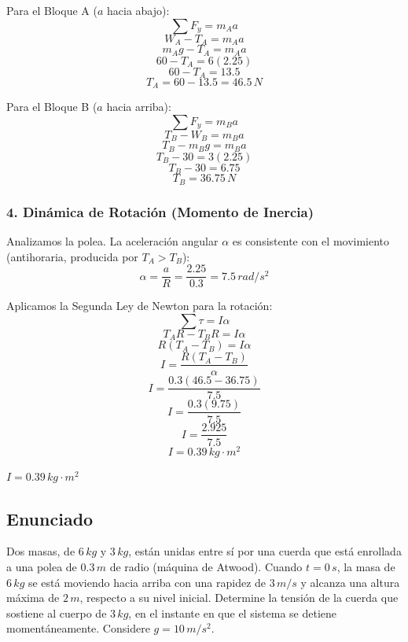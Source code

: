 \documentclass[12pt, a4paper]{article}
\begin{document}
Para el Bloque A ($a$ hacia abajo):
$$\sum F_y = m_A a$$
$$W_A - T_A = m_A a$$
$$m_A g - T_A = m_A a$$
$$60 - T_A = 6(2.25)$$
$$60 - T_A = 13.5$$
$$T_A = 60 - 13.5 = 46.5 \, \si{N}$$

Para el Bloque B ($a$ hacia arriba):
$$\sum F_y = m_B a$$
$$T_B - W_B = m_B a$$
$$T_B - m_B g = m_B a$$
$$T_B - 30 = 3(2.25)$$
$$T_B - 30 = 6.75$$
$$T_B = 36.75 \, \si{N}$$

\subsubsection*{4. Dinámica de Rotación (Momento de Inercia)}
Analizamos la polea. La aceleración angular $\alpha$ es consistente con el movimiento (antihoraria, producida por $T_A > T_B$):
$$\alpha = \frac{a}{R} = \frac{2.25}{0.3} = 7.5 \, \si{rad/s^2}$$

Aplicamos la Segunda Ley de Newton para la rotación:
$$\sum \tau = I \alpha$$
$$T_A R - T_B R = I \alpha$$
$$R(T_A - T_B) = I \alpha$$
$$I = \frac{R(T_A - T_B)}{\alpha}$$
$$I = \frac{0.3 (46.5 - 36.75)}{7.5}$$
$$I = \frac{0.3 (9.75)}{7.5}$$
$$I = \frac{2.925}{7.5}$$
$$I = 0.39 \, \si{kg\cdot m^2}$$

\begin{tcolorbox}[colback=green!5!white, colframe=green!50!black, title=Respuesta Final]
\centering \Large $I = 0.39 \, \si{kg\cdot m^2}$
\end{tcolorbox}

\newpage

\subsection*{Enunciado}
Dos masas, de $6 \, \si{kg}$ y $3 \, \si{kg}$, están unidas entre sí por una cuerda que está enrollada a una polea de $0.3 \, \si{m}$ de radio (máquina de Atwood). Cuando $t = 0 \, \si{s}$, la masa de $6 \, \si{kg}$ se está moviendo hacia arriba con una rapidez de $3 \, \si{m/s}$ y alcanza una altura máxima de $2 \, \si{m}$, respecto a su nivel inicial. Determine la tensión de la cuerda que sostiene al cuerpo de $3 \, \si{kg}$, en el instante en que el sistema se detiene momentáneamente. Considere $g = 10 \, \si{m/s^2}$.

\begin{center}
\end{center}
\end{document}
